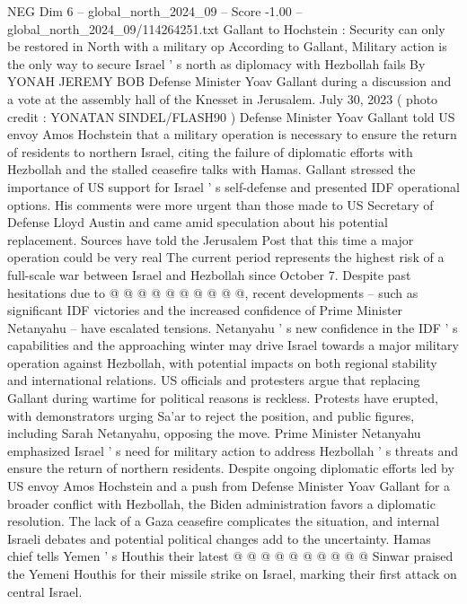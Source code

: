 \begin{textsample}{NEG Dim 6 – global\_north\_2024\_09 – Score -1.00 – global\_north\_2024\_09/114264251.txt}  \label{ex:f6_neg_093}
Gallant to Hochstein : Security can only be restored in North with a military op According to Gallant, Military action is the only way to secure Israel ' s north as diplomacy with Hezbollah fails By YONAH JEREMY BOB Defense Minister Yoav Gallant during a discussion and a vote at the assembly hall of the Knesset in Jerusalem.
July 30, 2023 ( photo credit : YONATAN SINDEL/FLASH90 ) Defense Minister Yoav Gallant told US envoy Amos Hochstein that a military operation is necessary to ensure the return of residents to northern Israel, citing the failure of diplomatic efforts with Hezbollah and the stalled ceasefire talks with Hamas.
Gallant stressed the importance of US support for Israel ' s self-defense and presented IDF operational options.
His comments were more urgent than those made to US Secretary of Defense Lloyd Austin and came amid speculation about his potential replacement.
Sources have told the Jerusalem Post that this time a major operation could be very real The current period represents the highest risk of a full-scale war between Israel and Hezbollah since October 7.
Despite past hesitations due to @ @ @ @ @ @ @ @ @ @, recent developments -- such as significant IDF victories and the increased confidence of Prime Minister Netanyahu -- have escalated tensions.
Netanyahu ' s new confidence in the IDF ' s capabilities and the approaching winter may drive Israel towards a major military operation against Hezbollah, with potential impacts on both regional stability and international relations.
US officials and protesters argue that replacing Gallant during wartime for political reasons is reckless.
Protests have erupted, with demonstrators urging Sa'ar to reject the position, and public figures, including Sarah Netanyahu, opposing the move.
Prime Minister Netanyahu emphasized Israel ' s need for military action to address Hezbollah ' s threats and ensure the return of northern residents.
Despite ongoing diplomatic efforts led by US envoy Amos Hochstein and a push from Defense Minister Yoav Gallant for a broader conflict with Hezbollah, the Biden administration favors a diplomatic resolution.
The lack of a Gaza ceasefire complicates the situation, and internal Israeli debates and potential political changes add to the uncertainty.
Hamas chief tells Yemen ' s Houthis their latest @ @ @ @ @ @ @ @ @ @ Sinwar praised the Yemeni Houthis for their missile strike on Israel, marking their first attack on central Israel.

\end{textsample}
